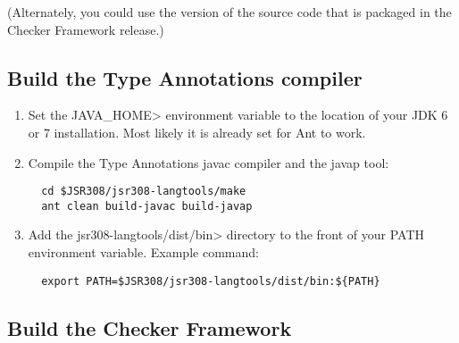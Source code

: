 \noindent
(Alternately, you could use the version of the source code that is packaged
in the Checker Framework release.)


\subsection{Build the Type Annotations compiler}

\begin{enumerate}
\item
Set the \<JAVA\_HOME> environment variable to the location of your JDK 6 or 7 installation. Most likely it is already set for Ant to work.
\item
Compile the Type Annotations javac compiler and the javap tool:

\begin{Verbatim}
  cd $JSR308/jsr308-langtools/make
  ant clean build-javac build-javap
\end{Verbatim}

\item
 Add the \<jsr308-langtools/dist/bin> directory to the front of your PATH environment variable.
  Example command:

\begin{Verbatim}
  export PATH=$JSR308/jsr308-langtools/dist/bin:${PATH}
\end{Verbatim}

\end{enumerate}



\subsection{Build the Checker Framework\label{building}}


